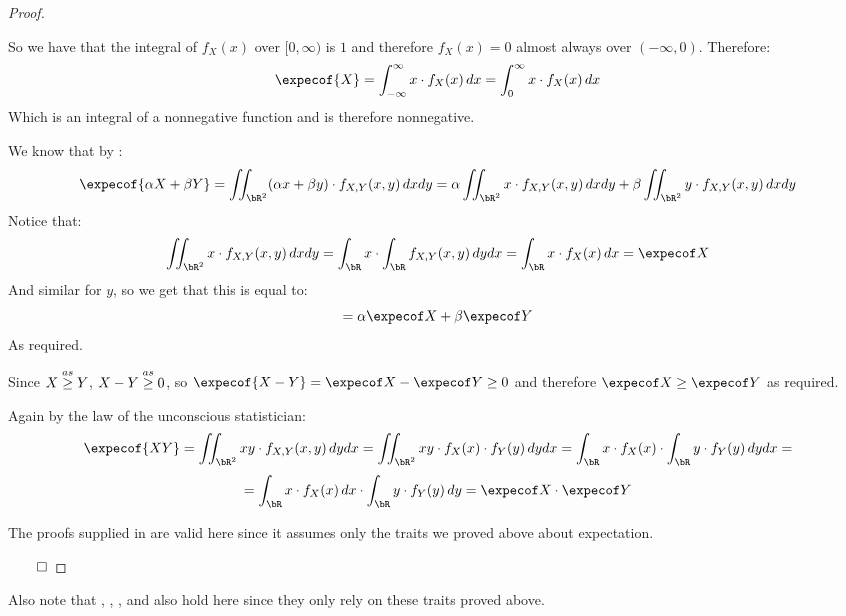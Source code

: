 \begin{proof}

	\begin{msecenumerate}[0pt]
		\mitem So we have that the integral of $f_X(x)$ over $[0,\infty)$ is $1$ and therefore $f_X(x)=0$ almost always over $(-\infty,0)$.
			Therefore:
			\[ \expecof{X} = \int_{-\infty}^\infty x\cdot f_X(x)\,dx = \int_0^\infty x\cdot f_X(x)\,dx \]
			Which is an integral of a nonnegative function and is therefore nonnegative.

		\mitem We know that by :
			\[ \expecof{\alpha X+\beta Y} = \iint_{\bR^2}(\alpha x+\beta y)\cdot f_{X,Y}(x,y)\,dx dy =
			\alpha\iint_{\bR^2}x\cdot f_{X,Y}(x,y)\,dx dy + \beta\iint_{\bR^2} y\cdot f_{X,Y}(x,y)\,dx dy \]
			Notice that:
			\[ \iint_{\bR^2} x\cdot f_{X,Y}(x,y)\,dx dy = \int_\bR x\cdot \int_\bR f_{X,Y}(x,y)\,dy dx = \int_\bR x\cdot f_X(x)\,dx = \expecof X \]
			And similar for $y$, so we get that this is equal to:
			\[ = \alpha\expecof X + \beta\expecof Y \]
			As required.

		\mitem Since $X\mathrel{\overset{as}\geq} Y$, $X-Y\mathrel{\overset{as}\geq}0$, so $\expecof{X-Y}=\expecof X-\expecof Y\geq 0$ and therefore $\expecof X\geq \expecof Y$ as required.

		\mitem Again by the law of the unconscious statistician:
			\[ \expecof{XY} = \iint_{\bR^2}xy\cdot f_{X,Y}(x,y)\,dy dx = \iint_{\bR^2}xy\cdot f_X(x)\cdot f_Y(y)\,dy dx =
			\int_\bR x\cdot f_X(x)\cdot \int_\bR y\cdot f_Y(y)\,dy dx = \]
			\[ = \int_\bR x\cdot f_X(x)\,dx \cdot \int_\bR y\cdot f_Y(y)\,dy = \expecof X\cdot\expecof Y \]

		\mitem The proofs supplied in  are valid here since it assumes only the traits we proved above about expectation.
	\end{msecenumerate}

	\hfill$\qed$

\end{proof}

Also note that , , , and  also hold here since they only rely on these traits
proved above.

